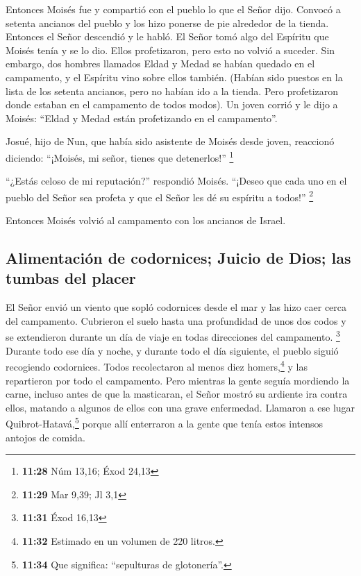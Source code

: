  Entonces Moisés fue y compartió con el pueblo lo que el
Señor dijo. Convocó a setenta ancianos del pueblo y los hizo ponerse de
pie alrededor de la tienda.  Entonces el Señor descendió
y le habló. El Señor tomó algo del Espíritu que Moisés tenía y se lo
dio. Ellos profetizaron, pero esto no volvió a suceder. 
Sin embargo, dos hombres llamados Eldad y Medad se habían quedado en el
campamento, y el Espíritu vino sobre ellos también. (Habían sido puestos
en la lista de los setenta ancianos, pero no habían ido a la tienda.
Pero profetizaron donde estaban en el campamento de todos modos).
 Un joven corrió y le dijo a Moisés: ``Eldad y Medad
están profetizando en el campamento''.

 Josué, hijo de Nun, que había sido asistente de Moisés
desde joven, reaccionó diciendo: ``¡Moisés, mi señor, tienes que
detenerlos!'' \footnote{\textbf{11:28} Núm 13,16; Éxod 24,13}

 ``¿Estás celoso de mi reputación?'' respondió Moisés.
``¡Deseo que cada uno en el pueblo del Señor sea profeta y que el Señor
les dé su espíritu a todos!'' \footnote{\textbf{11:29} Mar 9,39; Jl 3,1}

 Entonces Moisés volvió al campamento con los ancianos de
Israel.

\hypertarget{alimentaciuxf3n-de-codornices-juicio-de-dios-las-tumbas-del-placer}{%
\subsection{Alimentación de codornices; Juicio de Dios; las tumbas del
placer}\label{alimentaciuxf3n-de-codornices-juicio-de-dios-las-tumbas-del-placer}}

 El Señor envió un viento que sopló codornices desde el
mar y las hizo caer cerca del campamento. Cubrieron el suelo hasta una
profundidad de unos dos codos y se extendieron durante un día de viaje
en todas direcciones del campamento. \footnote{\textbf{11:31} Éxod 16,13}
 Durante todo ese día y noche, y durante todo el día
siguiente, el pueblo siguió recogiendo codornices. Todos recolectaron al
menos diez homers,\footnote{\textbf{11:32} Estimado en un volumen de 220
  litros.} y las repartieron por todo el campamento. 
Pero mientras la gente seguía mordiendo la carne, incluso antes de que
la masticaran, el Señor mostró su ardiente ira contra ellos, matando a
algunos de ellos con una grave enfermedad.  Llamaron a
ese lugar Quibrot-Hatavá,\footnote{\textbf{11:34} Que significa:
  ``sepulturas de glotonería''.} porque allí enterraron a la gente que
tenía estos intensos antojos de comida.

